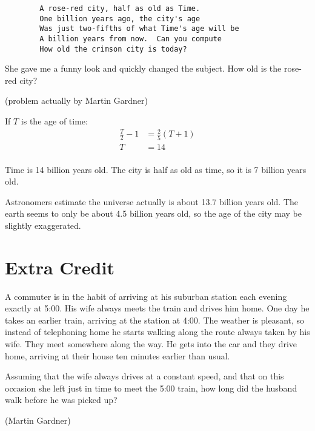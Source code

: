 \documentclass[letterpaper, landscape]{exam}
\begin{document}
\begin{questions}
      \begin{verbatim}
        A rose-red city, half as old as Time.
        One billion years ago, the city's age
        Was just two-fifths of what Time's age will be
        A billion years from now.  Can you compute
        How old the crimson city is today?
      \end{verbatim}

      She gave me a funny look and quickly changed the subject.  How old is the rose-red city?

      (problem actually by Martin Gardner)

      \begin{solution}
        If $T$ is the age of time:
        \begin{align*}
          \frac{T}{2} - 1 & = \frac{2}{5} (T + 1) \\
          T               & = 14 \\
        \end{align*}

        Time is 14 billion years old.  The city is half as old as time, so it is 7 billion years old.

        Astronomers estimate the universe actually is about 13.7 billion years old. The earth seems to only be
        about 4.5 billion years old, so the age of the city may be slightly exaggerated.

      \end{solution}
  \end{questions}

  \section{Extra Credit}

  A commuter is in the habit of arriving at his suburban station each evening exactly at 5:00.  His wife always meets
  the train and drives him home.  One day he takes an earlier train, arriving at the station at 4:00.  The weather is
  pleasant, so instead of telephoning home he starts walking along the route always taken by his wife.  They meet
  somewhere along the way.  He gets into the car and they drive home, arriving at their house ten minutes earlier than
  usual.  

  Assuming that the wife always drives at a constant speed, and that on this occasion she left just in time to meet
  the 5:00 train, how long did the husband walk before he was picked up?

  (Martin Gardner)
\end{document}

